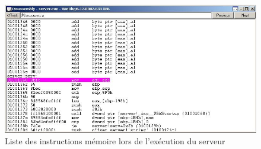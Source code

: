 \begin{figure}[H]
 \centering
 \includegraphics[width=.9\textwidth]{img/4_3.JPG}
 \caption{Liste des instructions mémoire lors de l'exécution du serveur}
 \label{img:4.3}
\end{figure}

